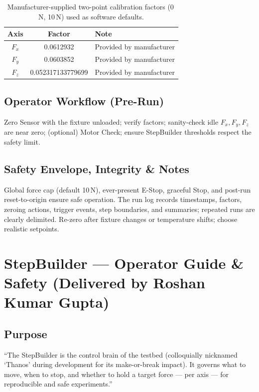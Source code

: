 \documentclass[
    twocolumn,
    fontsize = 10pt,
    parskip = half+,
    headings = small,
    headwidth = text,
    footwidth = text,
]{scrartcl}
\begin{document}
\begin{table}[htbp]
\centering
\caption{Manufacturer-supplied two-point calibration factors (0\,N, 10\,N) used as software defaults.}
\label{tab:calibration-factors}
\begin{tabular}{|c|c|l|}
\hline
\textbf{Axis} & \textbf{Factor} & \textbf{Note} \\
\hline
$F_x$ & 0.0612932 & Provided by manufacturer \\
$F_y$ & 0.0603852 & Provided by manufacturer \\
$F_z$ & 0.052317133779699 & Provided by manufacturer \\
\hline
\end{tabular}
\end{table}


\subsection{Operator Workflow (Pre-Run)}
Zero Sensor with the fixture unloaded; verify factors; sanity-check idle $F_x, F_y, F_z$ are near zero; (optional) Motor Check; ensure StepBuilder thresholds respect the safety limit.

\subsection{Safety Envelope, Integrity \& Notes}
Global force cap (default 10\,N), ever-present E-Stop, graceful Stop, and post-run reset-to-origin ensure safe operation. The run log records timestamps, factors, zeroing actions, trigger events, step boundaries, and summaries; repeated runs are clearly delimited. Re-zero after fixture changes or temperature shifts; choose realistic setpoints.


\section{StepBuilder — Operator Guide \& Safety \textnormal{(Delivered by Roshan Kumar Gupta)}}
\label{sec:stepbuilder}

\subsection{Purpose}
``The StepBuilder is the control brain of the testbed (colloquially nicknamed `Thanos' during development for its make-or-break impact). It governs what to move, when to stop, and whether to hold a target force — per axis — for reproducible and safe experiments.''
\end{document}
